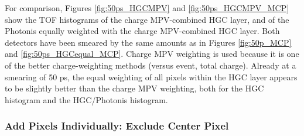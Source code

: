 \documentclass[12pt]{article}
\begin{document}
For comparison, Figures \ref{fig:50ps_HGCMPV} and \ref{fig:50ps_HGCMPV_MCP} show the TOF histograms of the charge MPV-combined HGC layer, and of the Photonis equally weighted with the charge MPV-combined HGC layer.
Both detectors have been smeared by the same amounts as in Figures \ref{fig:50p_MCP} and \ref{fig:50ps_HGCequal_MCP}.
Charge MPV weighting is used because it is one of the better charge-weighting methods (versus event, total charge). 
Already at a smearing of 50 ps, the equal weighting of all pixels within the HGC layer appears to be slightly better than the charge MPV weighting, both for the HGC histogram and the HGC/Photonis histogram. 

\subsubsection{Add Pixels Individually: Exclude Center Pixel}
\end{document}
